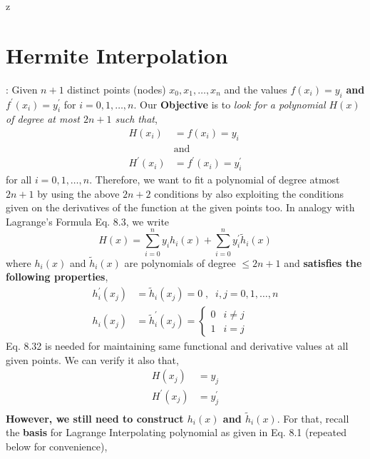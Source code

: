 z\documentclass[a4paper,12pt,twoside]{book}
\newcommand{\nll}[0]{\newline\newline}
\newcommand{\tit}[1]{\textit{#1}}
\newcommand{\defin}[0]{\boxed{\textbf{\textit{Definition}}}}
\begin{document}
\section{Hermite Interpolation}
\defin : Given $n+1$ distinct points (nodes) $x_0,x_1,\dots,x_n$ and the values $f(x_i) = y_i$ \textbf{and} $f^\prime(x_i) = y_i^\prime$ for $i=0,1,\dots,n$. Our \textbf{Objective} is to \tit{look for a polynomial $H(x)$ of degree at most $2n+1$ such that},
\begin{equation}
    \begin{split}
        H(x_i) &= f(x_i) = y_i\\
        &\text{and}\\
        H^\prime(x_i)&= f^\prime(x_i) = y^\prime_i 
    \end{split}
\end{equation}
for all $i = 0,1,\dots,n$.
Therefore, we want to fit a polynomial of degree atmost $2n+1$ by using the above $2n+2$ conditions by also exploiting the conditions given on the derivatives of the function at the given points too.
\nll
In analogy with Lagrange's Formula Eq. 8.3, we write
\[H(x) = \sum_{i=0}^n y_i h_i(x) + \sum_{i=0}^n y_i^\prime \tilde{h}_i(x)\]
where $h_i(x)$ and $\tilde{h}_i(x)$ are polynomials of degree $\le 2n+1$ and \textbf{satisfies the following properties},
\begin{equation}
    \begin{split}
        h_i^\prime(x_j) &= \tilde{h}_i(x_j) = 0 \;,\;\; i,j = 0,1,\dots,n\\
        h_i(x_j) &= \tilde{h}_i^\prime(x_j) = \begin{cases} 0 & i\neq j\\
        1 & i=j
        \end{cases}
    \end{split}
\end{equation}
Eq. 8.32 is needed for maintaining same functional and derivative values at all given points. We can verify it also that,
\begin{equation*}
    \begin{split}
        H(x_j) &= y_j\\
        H^\prime(x_j) &= y_j^\prime\\
    \end{split}
\end{equation*}
\textbf{However, we still need to construct $h_i(x)$ and $\tilde{h}_i(x)$}. For that, recall the \textbf{basis} for Lagrange Interpolating polynomial as given in Eq. 8.1 (repeated below for convenience),
\end{document}
